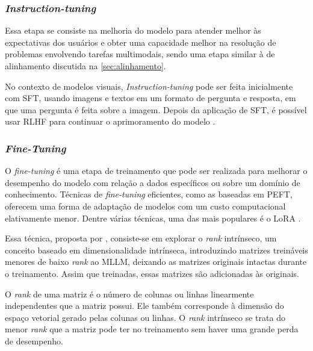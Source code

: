 \subsubsection{\textit{Instruction-tuning}}

Essa etapa se consiste na melhoria do modelo para atender melhor às expectativas dos usuários e obter uma capacidade melhor na resolução de problemas envolvendo tarefas
multimodais, sendo uma etapa similar à de alinhamento discutida na \autoref{sec:alinhamento}.

No contexto de modelos visuais, \textit{Instruction-tuning} pode ser feita inicialmente com \ac{SFT}, usando imagens e textos em um formato de pergunta e resposta, em
que uma pergunta é feita sobre a imagem. Depois da aplicação de \ac{SFT}, é possível usar \ac{RLHF} para continuar o aprimoramento do modelo \cite{mllm_survey_2024}.

\subsubsection{\textit{Fine-Tuning}} %

O \textit{fine-tuning} é uma etapa de treinamento que pode ser realizada para melhorar o desempenho do modelo com relação a dados específicos ou sobre um domínio de
conhecimento. Técnicas de \textit{fine-tuning} eficientes, como as baseadas em \ac{PEFT}, oferecem uma forma de adaptação de modelos com um custo computacional
elativamente menor. Dentre várias técnicas, uma das mais populares é o \ac{LoRA} \cite{llm_survey_2023}.


Essa técnica, proposta por \textcite{hu2021lora}, consiste-se em explorar o \textit{rank} intrínseco, um conceito baseado em dimensionalidade intrínseca, introduzindo
matrizes treináveis menores de baixo \textit{rank} ao \ac{MLLM}, deixando as matrizes originais intactas durante o treinamento. Assim que treinadas, essas matrizes são
adicionadas às originais.

O \textit{rank} de uma matriz é o número de colunas ou linhas linearmente independentes que a matriz possui. Ele também corresponde à dimensão do espaço vetorial
gerado pelas colunas ou linhas. O \textit{rank} intrínseco se trata do menor \textit{rank} que a matriz pode ter no treinamento sem haver uma grande perda de desempenho.


